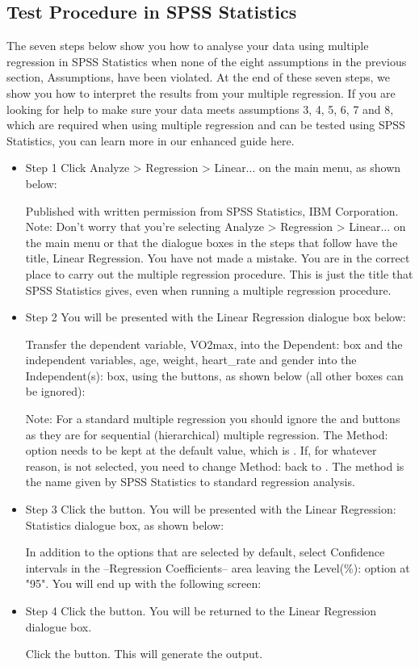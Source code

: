 \documentclass[]{article}
\begin{document}
	\subsection{Test Procedure in SPSS Statistics}
	The seven steps below show you how to analyse your data using multiple regression in SPSS Statistics when none of the eight assumptions in the previous section, Assumptions, have been violated. At the end of these seven steps, we show you how to interpret the results from your multiple regression. If you are looking for help to make sure your data meets assumptions 3, 4, 5, 6, 7 and 8, which are required when using multiple regression and can be tested using SPSS Statistics, you can learn more in our enhanced guide here.
	\begin{itemize}
		\item Step 1 Click Analyze > Regression > Linear... on the main menu, as shown below:
		
		
		Published with written permission from SPSS Statistics, IBM Corporation.
		Note: Don't worry that you're selecting Analyze > Regression > Linear... on the main menu or that the dialogue boxes in the steps that follow have the title, Linear Regression. You have not made a mistake. You are in the correct place to carry out the multiple regression procedure. This is just the title that SPSS Statistics gives, even when running a multiple regression procedure.
		
		\item Step 2 You will be presented with the Linear Regression dialogue box below:
		
		
		
		Transfer the dependent variable, VO2max, into the Dependent: box and the independent variables, age, weight, heart\_rate and gender into the Independent(s): box, using the  buttons, as shown below (all other boxes can be ignored):
		
		
		Note: For a standard multiple regression you should ignore the  and  buttons as they are for sequential (hierarchical) multiple regression. The Method: option needs to be kept at the default value, which is . If, for whatever reason,  is not selected, you need to change Method: back to . The  method is the name given by SPSS Statistics to standard regression analysis.
		
		\item Step 3 Click the  button. You will be presented with the Linear Regression: Statistics dialogue box, as shown below:
		
		
		In addition to the options that are selected by default, select Confidence intervals in the –Regression Coefficients– area leaving the Level(\%): option at "95". You will end up with the following screen:
		
		
		\item Step 4 Click the  button. You will be returned to the Linear Regression dialogue box.
		
		Click the  button. This will generate the output.
		
\end{itemize}		
\end{document}

